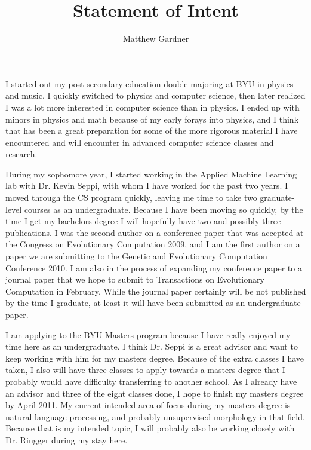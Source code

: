 \documentclass[onecolumn, 12pt]{article}
\title{Statement of Intent}
\author{Matthew Gardner}
\date{}
\begin{document}
\maketitle

I started out my post-secondary education double majoring at BYU in physics and
music.  I quickly switched to physics and computer science, then later realized
I was a lot more interested in computer science than in physics.  I ended up
with minors in physics and math because of my early forays into physics, and I
think that has been a great preparation for some of the more rigorous material
I have encountered and will encounter in advanced computer science classes and
research.

During my sophomore year, I started working in the Applied Machine Learning lab
with Dr.  Kevin Seppi, with whom I have worked for the past two years.  I moved
through the CS program quickly, leaving me time to take two graduate-level
courses as an undergraduate.  Because I have been moving so quickly, by the
time I get my bachelors degree I will hopefully have two and possibly three
publications.  I was the second author on a conference paper that was accepted
at the Congress on Evolutionary Computation 2009, and I am the first author on
a paper we are submitting to the Genetic and Evolutionary Computation
Conference 2010.  I am also in the process of expanding my conference paper to
a journal paper that we hope to submit to Transactions on Evolutionary
Computation in February.  While the journal paper certainly will be not
published by the time I graduate,  at least it will have been submitted as an
undergraduate paper.

I am applying to the BYU Masters program because I have really enjoyed my time
here as an undergraduate.  I think Dr. Seppi is a great advisor and want to 
keep working with him for my masters degree.  Because of the extra classes I
have taken, I also will have three classes to apply towards a masters degree
that I probably would have difficulty transferring to another school.  As I
already have an advisor and three of the eight classes done, I hope to finish
my masters degree by April 2011.  My current intended area of focus during my
masters degree is natural language processing, and probably unsupervised
morphology in that field.  Because that is my intended topic, I will probably
also be working closely with Dr. Ringger during my stay here.
\end{document}
